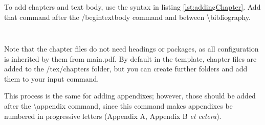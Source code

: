 	To add chapters and text body, use the syntax in listing \ref{lst:addingChapter}. Add that command after the {\ttfamily\small /begintextbody} command and between {\ttfamily\small \textbackslash bibliography}.

\begin{lstlisting}[caption = {Adding a chapter to text body}, label = {lst:addingChapter}, style = prettyListing, language = tex]
	%
	
\end{lstlisting}

	Note that the chapter files do not need headings or packages, as all configuration is inherited by them from {\texttt\small main.pdf}. By default in the template, chapter files are added to the {\ttfamily\small /tex/chapters} folder, but you can create further folders and add them to your {\ttfamily\small input} command.

	This process is the same for adding appendixes; however, those should be added after the {\ttfamily\small \textbackslash appendix} command, since this command makes appendixes be numbered in progressive letters (Appendix A, Appendix B \textit{et cetera}).
